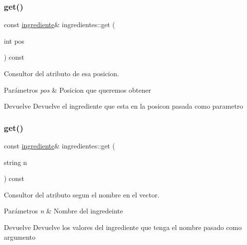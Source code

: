 \subsubsection{\texorpdfstring{get()}{get()}\hspace{0.1cm}{\footnotesize\ttfamily [1/2]}}
{\footnotesize\ttfamily const \hyperlink{classingrediente}{ingrediente}\& ingredientes\+::get (\begin{DoxyParamCaption}\item[{int}]{pos }\end{DoxyParamCaption}) const}



Consultor del atributo de esa posicion. 


\begin{DoxyParams}{Parámetros}
{\em pos} & Posicion que queremos obtener \\
\hline
\end{DoxyParams}
\begin{DoxyReturn}{Devuelve}
Devuelve el ingrediente que esta en la posicon pasada como parametro 
\end{DoxyReturn}
\mbox{\label{classingredientes_aae670bf5dc762313dff281c7c6aa1b4f}} 
\subsubsection{\texorpdfstring{get()}{get()}\hspace{0.1cm}{\footnotesize\ttfamily [2/2]}}
{\footnotesize\ttfamily const \hyperlink{classingrediente}{ingrediente}\& ingredientes\+::get (\begin{DoxyParamCaption}\item[{string}]{n }\end{DoxyParamCaption}) const}



Consultor del atributo segun el nombre en el vector. 


\begin{DoxyParams}{Parámetros}
{\em n} & Nombre del ingredeinte \\
\hline
\end{DoxyParams}
\begin{DoxyReturn}{Devuelve}
Devuelve los valores del ingrediente que tenga el nombre pasado como argumento 
\end{DoxyReturn}
\mbox{\label{classingredientes_adc3f70ae78a02993e6a4b8dac6a4ba07}} 
